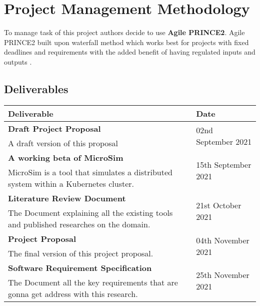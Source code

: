 \section{Project Management Methodology}

To manage task of this project authors decide to use \textbf{Agile PRINCE2}. Agile PRINCE2 built upon waterfall method which works best for projects with fixed deadlines and requirements with the added benefit of having regulated inputs and outputs \citep{WhatAreT79:online}.

\subsection{Deliverables}
\setlength\LTleft{0mm}
\begin{longtable}{|p{115mm}|p{35mm}|}
\hline
\textbf{Deliverable} & 
    \textbf{Date} \\ \hline
    \textbf{Draft Project Proposal} & 
    \multirow{2}{*}{02nd September 2021} \\
    A draft version of this proposal & 
     \\ \hline

    \textbf{A working beta of MicroSim}\label{microsim} & 
    \multirow{2}{*}{15th September 2021} \\
    MicroSim is a tool that simulates a distributed system within a Kubernetes cluster. & 
     \\ \hline


    \textbf{Literature Review Document} & 
    \multirow{2}{*}{21st October 2021} \\
    The Document explaining all the existing tools and published researches on the domain. & 
     \\ \hline

    \textbf{Project Proposal} & 
    \multirow{2}{*}{04th November 2021} \\
    The final version of this project proposal. & 
     \\ \hline

    \textbf{Software Requirement Specification} & 
    \multirow{2}{*}{25th November 2021} \\
    The Document all the key requirements that are gonna get address with this research. & 
     \\ \hline


\end{longtable}
